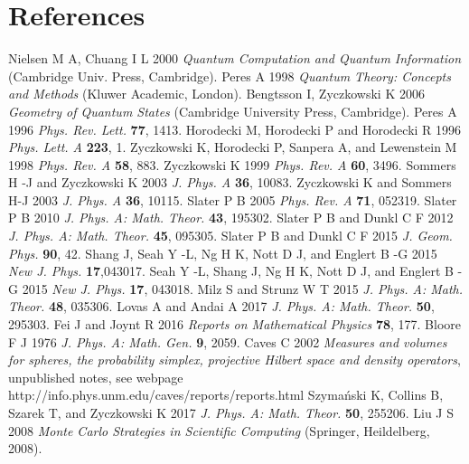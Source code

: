 \documentclass[12pt]{iopart}
\begin{document}
\section*{References}
\begin{thebibliography}{99}
%
%
%

 Nielsen M A, Chuang I L 2000 {\it Quantum Computation and Quantum Information} (Cambridge Univ. Press, Cambridge).
 Peres A 1998 {\it Quantum Theory: Concepts and Methods} (Kluwer Academic, London).
 Bengtsson I, Zyczkowski K 2006 {\it Geometry of Quantum States} (Cambridge University Press, Cambridge).
 Peres A 1996 {\it Phys. Rev. Lett.} {\bf77}, 1413.
 Horodecki M, Horodecki P and Horodecki R 1996 { \it  Phys. Lett. A} {\bf 223}, 1.
 Zyczkowski K, Horodecki P, Sanpera A, and Lewenstein M 1998 {\it Phys. Rev. A} {\bf 58}, 883.
 Zyczkowski K 1999 {\it  Phys. Rev. A} {\bf 60}, 3496.
 Sommers H -J and Zyczkowski K 2003 {\it  J. Phys. A }{\bf 36}, 10083.
 Zyczkowski K and Sommers H-J 2003 {\it  J. Phys. A} {\bf 36}, 10115.
 Slater P B 2005 {\it Phys. Rev. A} {\bf 71}, 052319.
 Slater P B 2010 {\it J. Phys. A: Math. Theor.} {\bf 43}, 195302.
 Slater P B and Dunkl C F 2012 {\it J. Phys. A: Math. Theor.} {\bf 45}, 095305.
 Slater P B and Dunkl C F 2015 {\it J. Geom. Phys.} {\bf 90}, 42.
 Shang J, Seah Y -L, Ng H K, Nott D J, and Englert B -G 2015 {\it  New J. Phys.} {\bf 17},043017.
 Seah Y -L, Shang J, Ng H K, Nott D J, and Englert B -G 2015 {\it  New J. Phys.} {\bf 17}, 043018.
 Milz S and Strunz W T 2015 {\it J. Phys. A: Math. Theor.} {\bf 48}, 035306.
 Lovas A and Andai A 2017 {\it J. Phys. A: Math. Theor.} {\bf 50}, 295303.
 Fei J and Joynt R 2016 {\it Reports on Mathematical Physics} {\bf 78}, 177.
 Bloore F J 1976 {\it J. Phys. A: Math. Gen.} {\bf 9}, 2059.
 Caves C 2002 {\it Measures and volumes for spheres, the probability simplex, projective Hilbert space and density
operators}, unpublished notes, see webpage http://info.phys.unm.edu/caves/reports/reports.html
 Szyma\'{n}ski K, Collins B, Szarek T, 
and Zyczkowski K 2017 {\it J. Phys. A: Math. Theor.} {\bf 50}, 255206.
 Liu J S 2008 {\it Monte Carlo Strategies in Scientific Computing} (Springer, Heildelberg, 2008).

\end{thebibliography}
\end{document}
